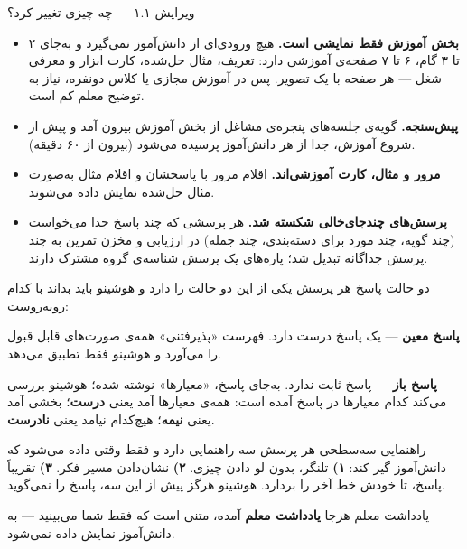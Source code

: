 \documentclass[11pt,a4paper]{article}
\newcommand{\software}{هوشینو}
\newcommand{\en}[1]{\lr{#1}}
\newcommand{\sq}[1]{«#1»}
\begin{document}
\begin{fasl}{ویرایش ۱.۱ — چه چیزی تغییر کرد؟}
\begin{itemize}
\item \textbf{بخش آموزش فقط نمایشی است.} هیچ ورودی‌ای از دانش‌آموز نمی‌گیرد و به‌جای ۲ تا ۳ گام،
۶ تا ۷ صفحه‌ی آموزشی دارد: تعریف، مثال حل‌شده، کارت ابزار و معرفی شغل — هر صفحه با یک تصویر.
پس در آموزش مجازی یا کلاس دونفره، نیاز به توضیح معلم کم است.
\item \textbf{پیش‌سنجه.} گویه‌ی \en{K1} جلسه‌های پنجره‌ی مشاغل از بخش آموزش بیرون آمد و پیش از
شروع آموزش، جدا از هر دانش‌آموز پرسیده می‌شود (بیرون از ۶۰ دقیقه).
\item \textbf{مرور و مثال، کارت آموزشی‌اند.} اقلام مرور با پاسخشان و اقلام مثال به‌صورت مثال حل‌شده نمایش داده می‌شوند.
\item \textbf{پرسش‌های چندجای‌خالی شکسته شد.} هر پرسشی که چند پاسخ جدا می‌خواست (چند گویه، چند مورد برای دسته‌بندی،
چند جمله) در ارزیابی و مخزن تمرین به چند پرسش جداگانه تبدیل شد؛ پاره‌های یک پرسش شناسه‌ی گروه مشترک دارند.
\end{itemize}
\end{fasl}

\begin{fasl}{دو حالت پاسخ}
هر پرسش یکی از این دو حالت را دارد و \software{} باید بداند با کدام روبه‌روست:

\smallskip\noindent
\textbf{\textcolor{anscol}{پاسخ معین}} — یک پاسخ درست دارد. فهرست
\sq{پذیرفتنی} همه‌ی صورت‌های قابل قبول را می‌آورد و \software{} فقط تطبیق می‌دهد.

\smallskip\noindent
\textbf{\textcolor{aicol}{پاسخ باز}} — پاسخ ثابت ندارد. به‌جای پاسخ،
\sq{معیارها} نوشته شده؛ \software{} بررسی می‌کند کدام معیارها در پاسخ آمده است:
همه‌ی معیارها آمد یعنی \textbf{درست}؛ بخشی آمد یعنی \textbf{نیمه}؛ هیچ‌کدام نیامد یعنی \textbf{نادرست}.
\end{fasl}

\begin{fasl}{راهنمایی سه‌سطحی}
هر پرسش سه راهنمایی دارد و فقط وقتی داده می‌شود که دانش‌آموز گیر کند:
\textbf{۱)} تلنگر، بدون لو دادن چیزی. \textbf{۲)} نشان‌دادن مسیر فکر.
\textbf{۳)} تقریباً پاسخ، تا خودش خط آخر را بردارد.
\software{} هرگز پیش از این سه، پاسخ را نمی‌گوید.
\end{fasl}

\begin{fasl}{یادداشت معلم}
هرجا \textbf{\textcolor{tchcol}{یادداشت معلم}} آمده، متنی است که فقط شما
می‌بینید — به دانش‌آموز نمایش داده نمی‌شود.
\end{fasl}
\end{document}
